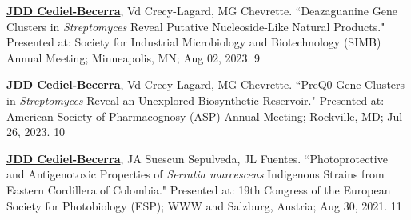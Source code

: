 \begin{cvpubs}
\cvpub
{\textbf{\underline{JDD Cediel-Becerra}}, Vd Crecy-Lagard, MG Chevrette. ``Deazaguanine Gene Clusters in \textit{Streptomyces} Reveal Putative Nucleoside-Like Natural Products." Presented at: Society for Industrial Microbiology and Biotechnology (SIMB) Annual Meeting; Minneapolis, MN; Aug 02, 2023.}
{9}

\cvpub
{\textbf{\underline{JDD Cediel-Becerra}}, Vd Crecy-Lagard, MG Chevrette. ``PreQ0 Gene Clusters in \textit{Streptomyces} Reveal an Unexplored Biosynthetic Reservoir." Presented at: American Society of Pharmacognosy (ASP) Annual Meeting; Rockville, MD; Jul 26, 2023.}
{10}


\cvpub
{\textbf{\underline{JDD Cediel-Becerra}}, JA Suescun Sepulveda, JL Fuentes. ``Photoprotective and Antigenotoxic Properties of \textit{Serratia marcescens} Indigenous Strains from Eastern Cordillera of Colombia." Presented at: 19th Congress of the European Society for Photobiology (ESP); WWW and Salzburg, Austria; Aug 30, 2021.}
{11}

\end{cvpubs}
